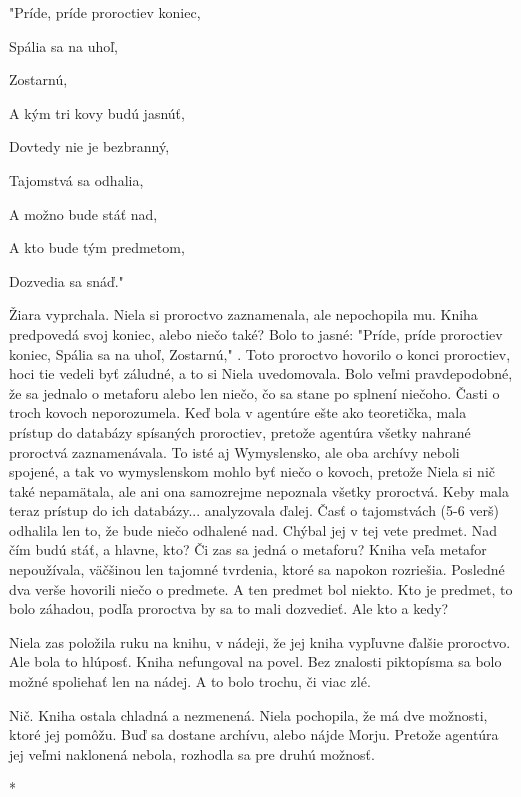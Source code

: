 \documentclass{book}
\begin{document}
"$ $Príde, príde proroctiev koniec,

Spália sa na uhoľ,

Zostarnú,

A kým tri kovy budú jasnúť,

Dovtedy nie je bezbranný,

Tajomstvá sa odhalia,

A možno bude stáť nad,

A kto bude tým predmetom,

Dozvedia sa snáď."$ $ 

Žiara vyprchala. Niela si proroctvo zaznamenala, ale nepochopila mu. Kniha predpovedá svoj koniec, alebo niečo také? Bolo to jasné: "$ $Príde, príde proroctiev koniec, Spália sa na uhoľ, Zostarnú,"$ $ . Toto proroctvo hovorilo o konci proroctiev, hoci tie vedeli byť záludné, a to si Niela uvedomovala. Bolo veľmi pravdepodobné, že sa jednalo o metaforu alebo len niečo, čo sa stane po splnení niečoho. Časti o troch kovoch neporozumela. Keď bola v agentúre ešte ako teoretička, mala prístup do databázy spísaných proroctiev, pretože agentúra všetky nahrané proroctvá zaznamenávala. To isté aj Wymyslensko, ale oba archívy neboli spojené, a tak vo wymyslenskom mohlo byť niečo o kovoch, pretože Niela si nič také nepamätala, ale ani ona samozrejme nepoznala všetky proroctvá. Keby mala teraz prístup do ich databázy... analyzovala ďalej. Časť o tajomstvách (5-6 verš) odhalila len to, že bude niečo odhalené nad. Chýbal jej v tej vete predmet. Nad čím budú stáť, a hlavne, kto? Či zas sa jedná o metaforu? Kniha veľa metafor nepoužívala, väčšinou len tajomné tvrdenia, ktoré sa napokon rozriešia. Posledné dva verše hovorili niečo o predmete. A ten predmet bol niekto. Kto je predmet, to bolo záhadou, podľa proroctva by sa to mali dozvedieť. Ale kto a kedy?

Niela zas položila ruku na knihu, v nádeji, že jej kniha vypľuvne ďalšie proroctvo. Ale bola to hlúposť. Kniha nefungoval na povel. Bez znalosti piktopísma sa bolo možné spoliehať len na nádej. A to bolo trochu, či viac zlé.

Nič. Kniha ostala chladná a nezmenená. Niela pochopila, že má dve možnosti, ktoré jej pomôžu. Buď sa dostane archívu, alebo nájde Morju. Pretože agentúra jej veľmi naklonená nebola, rozhodla sa pre druhú možnosť.

\begin{center}

*

\end{center}
\end{document}
